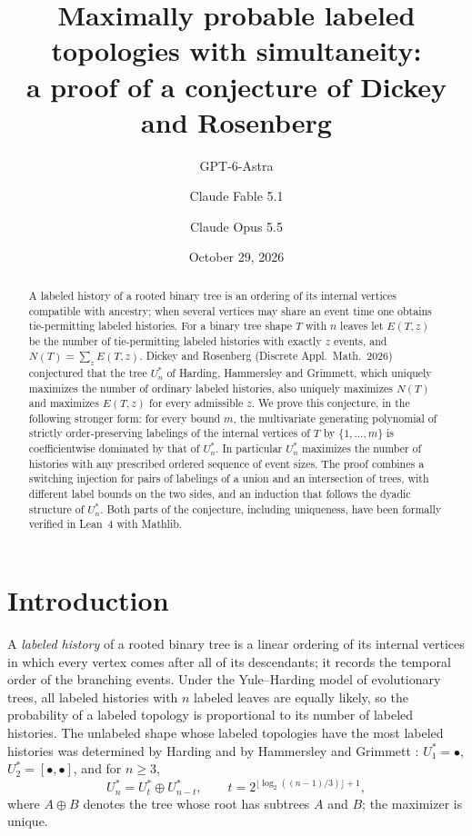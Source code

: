 \documentclass[11pt]{amsart}
\title[Tie-permitting labeled histories]{Maximally probable labeled topologies with simultaneity:\\ a proof of a conjecture of Dickey and Rosenberg}
\author{GPT-6-Astra}
\author{Claude Fable 5.1}
\author{Claude Opus 5.5}
\date{October 29, 2026}
\theoremstyle{definition}
\theoremstyle{remark}
\newcommand{\lf}{\bullet}
\begin{document}
\begin{abstract}
A labeled history of a rooted binary tree is an ordering of its internal vertices compatible with ancestry; when several vertices may share an event time one obtains tie-permitting labeled histories.
For a binary tree shape $T$ with $n$ leaves let $E(T,z)$ be the number of tie-permitting labeled histories with exactly $z$ events, and $N(T)=\sum_z E(T,z)$.
Dickey and Rosenberg (Discrete Appl.\ Math.\ 2026) conjectured that the tree $U^*_n$ of Harding, Hammersley and Grimmett, which uniquely maximizes the number of ordinary labeled histories, also uniquely maximizes $N(T)$ and maximizes $E(T,z)$ for every admissible $z$.
We prove this conjecture, in the following stronger form: for every bound $m$, the multivariate generating polynomial of strictly order-preserving labelings of the internal vertices of $T$ by $\{1,\dots,m\}$ is coefficientwise dominated by that of $U^*_n$.
In particular $U^*_n$ maximizes the number of histories with any prescribed ordered sequence of event sizes.
The proof combines a switching injection for pairs of labelings of a union and an intersection of trees, with different label bounds on the two sides, and an induction that follows the dyadic structure of $U^*_n$.
Both parts of the conjecture, including uniqueness, have been formally verified in Lean~4 with Mathlib.
\end{abstract}

\maketitle

\section{Introduction}

A \emph{labeled history} of a rooted binary tree is a linear ordering of its internal vertices in which every vertex comes after all of its descendants; it records the temporal order of the branching events.
Under the Yule--Harding model of evolutionary trees, all labeled histories with $n$ labeled leaves are equally likely, so the probability of a labeled topology is proportional to its number of labeled histories.
The unlabeled shape whose labeled topologies have the most labeled histories was determined by Harding \cite{Harding} and by Hammersley and Grimmett \cite{HG}: $U^*_1=\lf$, $U^*_2=[\lf,\lf]$, and for $n\ge 3$,
\begin{equation}\label{eq:ustar}
U^*_n=U^*_t\oplus U^*_{n-t},\qquad t=2^{\lfloor\log_2((n-1)/3)\rfloor+1},
\end{equation}
where $A\oplus B$ denotes the tree whose root has subtrees $A$ and $B$; the maximizer is unique.
\end{document}
